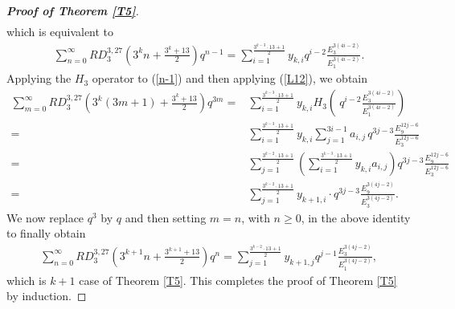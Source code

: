 \documentclass[11pt,a4paper]{article}
\numberwithin{equation}{section}
\theoremstyle{plain}
\begin{document}
\begin{proof}[\it\textbf{Proof of Theorem \ref{T5}}]
\begin{align*}
\end{align*}
which is equivalent to
	\begin{align}\label{n-1}
	\sum_{n=0}^{\infty}RD_3^{3,27}\left(3^kn+\frac{3^k+13}{2}\right)q^{n-1}=\sum_{i=1}^{\frac{3^{k-3}\cdot13+1}{2}}y_{k,i}q^{i-2}\frac{E_3^{3(4i-2)}}{E_1^{3(4i-2)}}.
\end{align}
Applying the $H_3$ operator to (\ref{n-1}) and then applying (\ref{L12}), we obtain
\begin{align*}
	\sum_{m=0}^{\infty}RD_3^{3,27}\left(3^k(3m+1)+\frac{3^k+13}{2}\right)q^{3m}=&\sum_{i=1}^{\frac{3^{k-3}\cdot 13+1}{2}}y_{k,i}H_3\left(\ q^{i-2}\frac{E_3^{3(4i-2)}}{E_1^{3(4i-2)}}\right)\\
=&\sum_{i=1}^{\frac{3^{k-3}\cdot 13+1}{2}}y_{k,i}\sum_{j=1}^{3i-1} a_{i,j}\,
q^{3j-3}\frac{E_{9}^{12j-6}}{E_{3}^{12j-6}}\\
	=&\sum_{j=1}^{\frac{3^{k-2}\cdot13+1}{2}}\left(\sum_{i=1}^{\frac{3^{k-3}\cdot13+1}{2}}y_{k,i}a_{i,j}\right)q^{3j-3}\frac{E_{9}^{12j-6}}{E_{3}^{12j-6}}\\
	=&\sum_{j=1}^{\frac{3^{k-2}\cdot13+1}{2}}y_{{k+1},i}\cdot q^{3j-3}\frac{E_{9}^{3({4j-2})}}{E_{3}^{3({4j-2})}}.
\end{align*}
We now replace $q^3$ by $q$ and then setting $m=n$, with $n \geq 0$, in the above identity to finally obtain
\begin{align*}
	\sum_{n=0}^{\infty}RD_3^{3,27}\left(3^{k+1}n+\frac{3^{k+1}+13}{2}\right)q^{n}=\sum_{j=1}^{\frac{3^{k-2}\cdot13+1}{2}}y_{{k+1},j}q^{j-1}\frac{E_3^{3(4j-2)}}{E_1^{3(4j-2)}},
\end{align*}
which is $k+1$ case of Theorem \ref{T5}. This completes the proof of Theorem \ref{T5} by induction.
	\end{proof}
\end{document}
